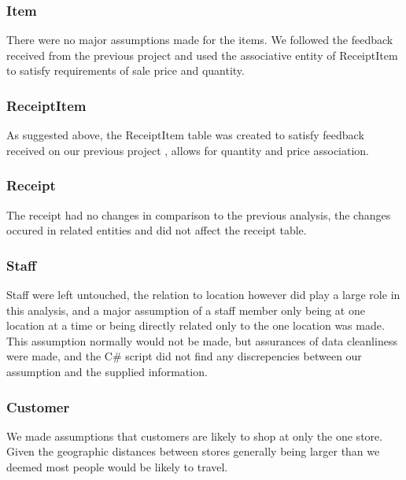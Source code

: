 \documentclass{article}
\begin{document}
            \subsubsection{Item}
                There were no major assumptions made for the items.
                We followed the feedback received from the previous project 
                and used the associative entity of ReceiptItem
                to satisfy requirements of sale price and quantity.

            \subsubsection{ReceiptItem}
                As suggested above, the ReceiptItem table was created
                to satisfy feedback received on our previous project
                , allows for quantity and price association.

            \subsubsection{Receipt}
                The receipt had no changes in comparison to the previous
                analysis, the changes occured in related entities 
                and did not affect the receipt table.

            \subsubsection{Staff}
                Staff were left untouched, the relation to location 
                however did play a large role in this analysis, and 
                a major assumption of a staff member only being at one 
                location at a time or being directly related only to
                the one location was made.
                \\
                This assumption normally would not be made, but 
                assurances of data cleanliness were made, and the C\#
                script did not find any discrepencies between our assumption and the supplied information.

            \subsubsection{Customer}
                We made assumptions that customers are likely to shop at only the one store. Given the geographic distances
                between stores generally being larger than we deemed 
                most people would be likely to travel.
\end{document}
